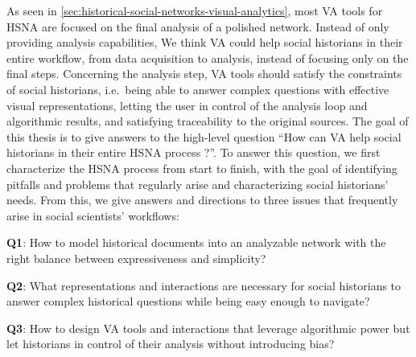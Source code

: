 As seen in \autoref{sec:historical-social-networks-visual-analytics}, most VA tools for HSNA are focused on the final analysis of a polished network.
Instead of only providing analysis capabilities, We think VA could help social historians in their entire workflow, from data acquisition to analysis, instead of focusing only on the final steps.
Concerning the analysis step, VA tools should satisfy the constraints of social historians, i.e.\ being able to answer complex questions with effective visual representations, letting the user in control of the analysis loop and algorithmic results, and satisfying traceability to the original sources.
The goal of this thesis is to give answers to the high-level question ``How can VA help social historians in their entire HSNA process ?''.
To answer this question, we first characterize the HSNA process from start to finish, with the goal of identifying pitfalls and problems that regularly arise and characterizing social historians' needs.
From this, we give answers and directions to three issues that frequently arise in social scientists' workflows:

\newcommand{\qone}{\textbf{Q1}\xspace}
\newcommand{\qtwo}{\textbf{Q2}\xspace}
\newcommand{\qthree}{\textbf{Q3}\xspace}
\begin{description}
    \item \qone:  How to model historical documents into an analyzable network with the right balance between expressiveness and simplicity?
    \item \qtwo:  What representations and interactions are necessary for social historians to answer complex historical questions while being easy enough to navigate?
    \item \qthree: How to design VA tools and interactions that leverage algorithmic power but let historians in control of their analysis without introducing bias?
\end{description}


